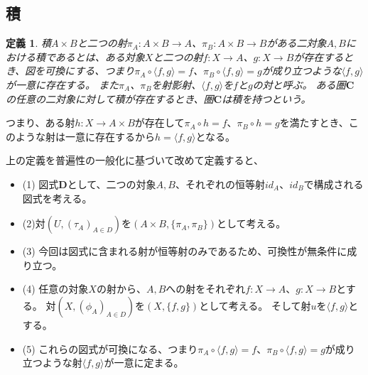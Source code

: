 \documentclass[dvipdfmx]{jsarticle}
\newcommand{\cat}[1]{\boldsymbol{#1}}
\newcommand{\arrow}{\rightarrow}
\newcommand{\tuple}[1]{\langle #1\rangle}
\newcommand{\mor}[3]{#1:#2\arrow #3}
\newtheorem{define}{定義}[section]
\begin{document}
	\subsection{積}
	\begin{define}

		積$A\times B$と二つの射$\mor{\pi_A}{A\times B}{A}$、$\mor{\pi_B}{A\times B}{B}$がある二対象$A,B$における積であるとは、ある対象$X$と二つの射$\mor{f}{X}{A}$、$\mor{g}{X}{B}$が存在するとき、図を可換にする、つまり$\pi_A\circ\tuple{f,g}=f$、$\pi_B\circ\tuple{f,g}=g$が成り立つような$\tuple{f,g}$が一意に存在する。
		また$\pi_A$、$\pi_B$を射影射、$\tuple{f,g}$を$f$と$g$の対と呼ぶ。
		ある圏$\cat{C}$の任意の二対象に対して積が存在するとき、圏$\cat{C}$は積を持つという。

		\begin{center}
		\end{center}
	\end{define}

	つまり、ある射$\mor{h}{X}{A\times B}$が存在して$\pi_A\circ h=f$、$\pi_B\circ h=g$を満たすとき、このような射は一意に存在するから$h=\tuple{f,g}$となる。

	上の定義を普遍性の一般化に基づいて改めて定義すると、
	\begin{itemize}
		\item (1)
		図式$\cat{D}$として、二つの対象$A,B$、それぞれの恒等射$id_A$、$id_B$で構成される図式を考える。
		\item (2)対$(U,(\tau_A)_{A\in D})$を$(A\times B,\{\pi_A,\pi_B\})$として考える。
		\item (3)
		今回は図式に含まれる射が恒等射のみであるため、可換性が無条件に成り立つ。
		\item (4)
		任意の対象$X$の射から、$A,B$への射をそれぞれ$\mor{f}{X}{A}$、$\mor{g}{X}{B}$とする。
		対$(X,(\phi_A)_{A\in D})$を$(X,\{f,g\})$として考える。
		そして射$u$を$\tuple{f,g}$とする。
		\item (5)
		これらの図式が可換になる、つまり$\pi_A\circ\tuple{f,g}=f$、$\pi_B\circ\tuple{f,g}=g$が成り立つような射$\tuple{f,g}$が一意に定まる。
	\end{itemize}
\end{document}
